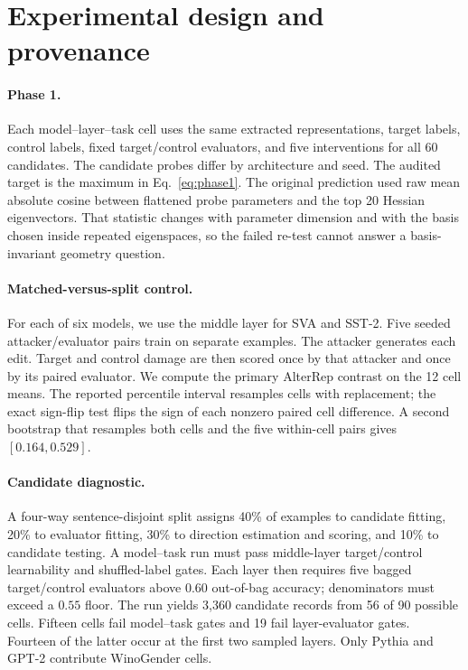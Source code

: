 \documentclass{article}
\newcommand{\SplitCells}{12}
\begin{document}
\section{Experimental design and provenance}
\label{app:design}

\paragraph{Phase 1.}
Each model--layer--task cell uses the same extracted representations, target labels, control labels, fixed target/control evaluators, and five interventions for all 60 candidates. The candidate probes differ by architecture and seed. The audited target is the maximum in Eq.~\ref{eq:phase1}. The original prediction used raw mean absolute cosine between flattened probe parameters and the top 20 Hessian eigenvectors. That statistic changes with parameter dimension and with the basis chosen inside repeated eigenspaces, so the failed re-test cannot answer a basis-invariant geometry question.

\paragraph{Matched-versus-split control.}
For each of six models, we use the middle layer for SVA and SST-2. Five seeded attacker/evaluator pairs train on separate examples. The attacker generates each edit. Target and control damage are then scored once by that attacker and once by its paired evaluator. We compute the primary AlterRep contrast on the \SplitCells{} cell means. The reported percentile interval resamples cells with replacement; the exact sign-flip test flips the sign of each nonzero paired cell difference. A second bootstrap that resamples both cells and the five within-cell pairs gives $[0.164,0.529]$.

\paragraph{Candidate diagnostic.}
A four-way sentence-disjoint split assigns 40\% of examples to candidate fitting, 20\% to evaluator fitting, 30\% to direction estimation and scoring, and 10\% to candidate testing. A model--task run must pass middle-layer target/control learnability and shuffled-label gates. Each layer then requires five bagged target/control evaluators above $0.60$ out-of-bag accuracy; denominators must exceed a $0.55$ floor. The run yields 3,360 candidate records from 56 of 90 possible cells. Fifteen cells fail model--task gates and 19 fail layer-evaluator gates. Fourteen of the latter occur at the first two sampled layers. Only Pythia and GPT-2 contribute WinoGender cells.
\end{document}
